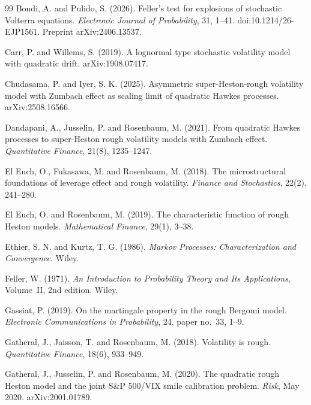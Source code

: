 \documentclass[11pt,a4paper]{article}
\theoremstyle{definition}
\begin{document}
\begin{thebibliography}{99}
Bondi, A. and Pulido, S. (2026). Feller's test for explosions of stochastic Volterra equations. \emph{Electronic Journal of Probability}, 31, 1--41. doi:10.1214/26-EJP1561. Preprint arXiv:2406.13537.

Carr, P. and Willems, S. (2019). A lognormal type stochastic volatility model with quadratic drift. arXiv:1908.07417.

Chudasama, P. and Iyer, S. K. (2025). Asymmetric super-Heston-rough volatility model with Zumbach effect as scaling limit of quadratic Hawkes processes. arXiv:2508.16566.

Dandapani, A., Jusselin, P. and Rosenbaum, M. (2021). From quadratic Hawkes processes to super-Heston rough volatility models with Zumbach effect. \emph{Quantitative Finance}, 21(8), 1235--1247.

El Euch, O., Fukasawa, M. and Rosenbaum, M. (2018). The microstructural foundations of leverage effect and rough volatility. \emph{Finance and Stochastics}, 22(2), 241--280.

El Euch, O. and Rosenbaum, M. (2019). The characteristic function of rough Heston models. \emph{Mathematical Finance}, 29(1), 3--38.

Ethier, S. N. and Kurtz, T. G. (1986). \emph{Markov Processes: Characterization and Convergence}. Wiley.

Feller, W. (1971). \emph{An Introduction to Probability Theory and Its Applications}, Volume~II, 2nd edition. Wiley.

Gassiat, P. (2019). On the martingale property in the rough Bergomi model. \emph{Electronic Communications in Probability}, 24, paper no.~33, 1--9.

Gatheral, J., Jaisson, T. and Rosenbaum, M. (2018). Volatility is rough. \emph{Quantitative Finance}, 18(6), 933--949.

Gatheral, J., Jusselin, P. and Rosenbaum, M. (2020). The quadratic rough Heston model and the joint S\&P 500/VIX smile calibration problem. \emph{Risk}, May 2020. arXiv:2001.01789.


\end{thebibliography}
\end{document}
